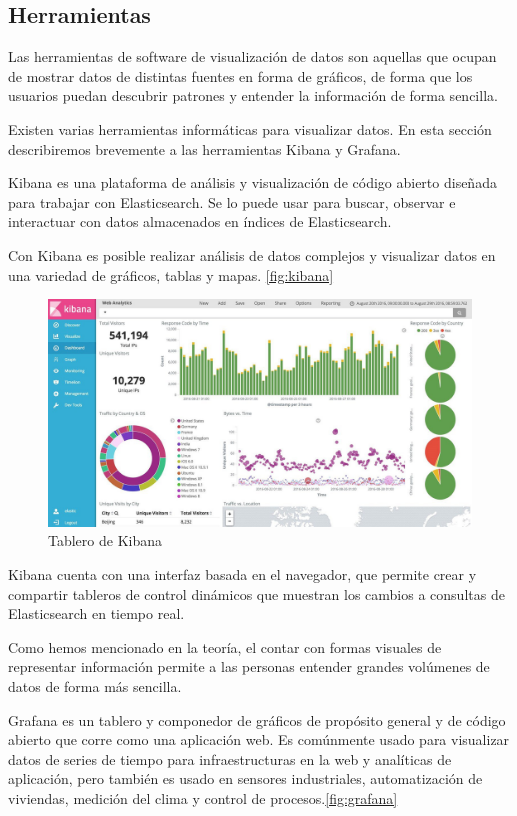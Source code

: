 \subsection{Herramientas}
\label{herramientas-de-visualizacion}

Las herramientas de software de visualización de datos son aquellas que ocupan de mostrar datos de distintas fuentes en forma de gráficos, de forma que los usuarios puedan descubrir patrones y entender la información de forma sencilla.

Existen varias herramientas informáticas para visualizar datos. En esta sección describiremos brevemente a las herramientas Kibana y Grafana.

Kibana es una plataforma de análisis y visualización de código abierto diseñada para trabajar con Elasticsearch. Se lo puede usar para buscar, observar e interactuar con datos almacenados en índices de Elasticsearch.

Con Kibana es posible realizar análisis de datos complejos y visualizar datos en una variedad de gráficos, tablas y mapas. \autoref{fig:kibana}


\begin{figure}
  \includegraphics[width=\linewidth]{src/images/05-capitulo-5/kibana.jpg}
  \caption{Tablero de Kibana}
  \label{fig:kibana}
\end{figure}

Kibana cuenta con una interfaz basada en el navegador, que permite crear y compartir tableros de control dinámicos que muestran los cambios a consultas de Elasticsearch en tiempo real.

Como hemos mencionado en la teoría, el contar con formas visuales de representar información permite a las personas entender grandes volúmenes de datos de forma más sencilla.

Grafana es un tablero y componedor de gráficos de propósito general y de código abierto que corre como una aplicación web. Es comúnmente usado para visualizar datos de series de tiempo para infraestructuras en la web y analíticas de aplicación, pero también es usado en sensores industriales, automatización de viviendas, medición del clima y control de procesos.\autoref{fig:grafana}

